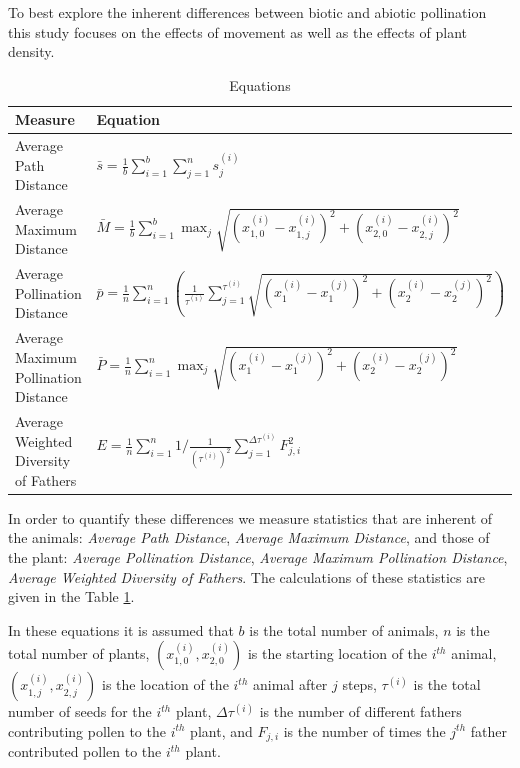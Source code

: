   To best explore the inherent differences between biotic and abiotic pollination this study focuses
  on the effects of movement as well as the effects of plant density.  
  \begin{table}[h]\label{eqn}
    \begin{tabular}{|l|l|}
      \hline
      Measure & Equation \\ \hline   \hline
      Average Path Distance & $\displaystyle\bar{s} = \frac{1}{b} \sum_{i=1}^b \sum_{j=1}^n s^{\left(i\right)}_j$ \\ \hline
      Average Maximum Distance & $\displaystyle \bar{M} = \frac{1}{b} \sum_{i=1}^b \max_j \sqrt{\left(x^{\left(i\right)}_{1,0}
    - x^{\left(i\right)}_{1,j}\right)^2 +
          \left(x^{\left(i\right)}_{2,0} -
    x^{\left(i\right)}_{2,j}\right)^2}  $ \\  \hline
      Average Pollination Distance & $\displaystyle \bar{p} = \frac{1}{n} \sum_{i=1}^{n} \left(
    \frac{1}{\tau^{\left(i\right)}} \sum_{j=1}^{\tau^{\left(i\right)}}
    \sqrt{\left(x^{\left(i\right)}_1 -
    x^{\left(j\right)}_1\right)^2 + \left(x^{\left(i\right)}_2 -
        x^{\left(j\right)}_2\right)^2}
        \right)  $ \\  \hline
      Average Maximum Pollination Distance & $\displaystyle \bar{P} = \frac{1}{n} \sum_{i=1}^{n} \max_j \sqrt{\left(x^{\left(i\right)}_1 -
    x^{\left(j\right)}_1\right)^2 + \left(x^{\left(i\right)}_2 -
        x^{\left(j\right)}_2\right)^2}$ \\  \hline
      Average Weighted Diversity of Fathers & $\displaystyle E = \frac{1}{n} \sum_{i=1}^n 1/\frac{1}{\left(\tau^{\left(i\right)}\right)^2}
    \sum_{j=1}^{\Delta\tau^{\left(i\right)}} F^2_{j,i} $ \\
      \hline
    \end{tabular}
    \caption{Equations}
  \end{table}
  In order to quantify these differences we measure statistics that are inherent of the animals:
  \emph{Average Path Distance}, \emph{Average Maximum Distance}, and those of the plant:
  \emph{Average Pollination Distance}, \emph{Average Maximum Pollination Distance}, \emph{Average
  Weighted Diversity of Fathers}.  The calculations of these statistics are given in the Table
  \ref{eqn}.

  In these equations it is assumed that $b$ is the total number of animals, $n$ is the total number
  of plants, $(x_{1,0}^{(i)},x_{2,0}^{(i)})$ is the starting location of the $i^{th}$ animal,
  $(x_{1,j}^{(i)},x_{2,j}^{(i)})$ is the location of the $i^{th}$ animal after $j$ steps,
  $\tau^{(i)}$ is the total number of seeds for the $i^{th}$ plant, $\Delta\tau^{(i)}$ is the number
  of different fathers contributing pollen to the $i^{th}$ plant, and $F_{j,i}$ is the number of
  times the $j^{th}$ father contributed pollen to the $i^{th}$ plant.

